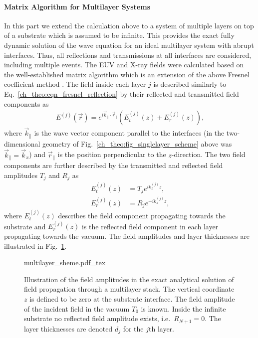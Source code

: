 \paragraph{Matrix Algorithm for Multilayer Systems} \label{ch_theo:sec_matrix_algorithm}
In this part we extend the calculation above to a system of multiple layers on top of a substrate which is assumed to be infinite. This provides the exact fully dynamic solution of the wave equation for an ideal multilayer system with abrupt interfaces. Thus, all reflections and transmissions at all interfaces are considered, including multiple events. The EUV and X-ray fields were calculated based on the well-established matrix algorithm which is an extension of the above Fresnel coefficient method \cite{born_principles_1965,mikulik_x-ray_1997}. The field inside each layer $j$ is described similarly to Eq.~\eqref{ch_theo:eqn_fresnel_reflection} by their reflected and transmitted field components as
\begin{align}
E^{(j)}(\vec{r}) = e^{i \vec{k}_\parallel \cdot \vec{r}_\parallel} (E_t^{(j)}(z) + E_r^{(j)}(z)) \text{,} \label{ch_theo:eqn_multilayer_solution_transmitted_and_reflected}
\end{align}
where $\vec{k}_\parallel$ is the wave vector component parallel to the interfaces (in the two-dimensional geometry of Fig.~\ref{ch_theo:fig_singlelayer_scheme} above was $\vec{k}_\parallel = \vec{k}_x$) and $\vec{r}_\parallel$ is the position perpendicular to the $z$-direction. The two field components are further described by the transmitted and reflected field amplitudes $T_j$ and $R_j$ as
\begin{align}
E_t^{(j)}(z) &= T_{j} e^{i k_z^{(j)} z} \text{,} \label{ch_theo:eqn_multilayer_amplitude_transmitted} \\
E_r^{(j)}(z) &= R_{j} e^{-i k_z^{(j)} z} \text{,} \label{ch_theo:eqn_multilayer_amplitude_reflected}
\end{align}
where $E_t^{(j)}(z)$ describes the field component propagating towards the substrate and $E_r^{(j)}(z)$ is the reflected field component in each layer propagating towards the vacuum. The field amplitudes and layer thicknesses are illustrated in Fig.~\ref{ch_theo:fig_multilayer_scheme}.
\begin{figure}[htb]
    {multilayer_sheme.pdf_tex}
    \caption[Field amplitudes in the exact solution for a multilayer system.]{Illustration of the field amplitudes in the exact analytical solution of field propagation through a multilayer stack. The vertical coordinate $z$ is defined to be zero at the substrate interface. The field amplitude of the incident field in the vacuum $T_0$ is known. Inside the infinite substrate no reflected field amplitude exists, i.e.~$R_{N+1} = 0$. The layer thicknesses are denoted $d_j$ for the $j$th layer.}
    \label{ch_theo:fig_multilayer_scheme}
\end{figure}
